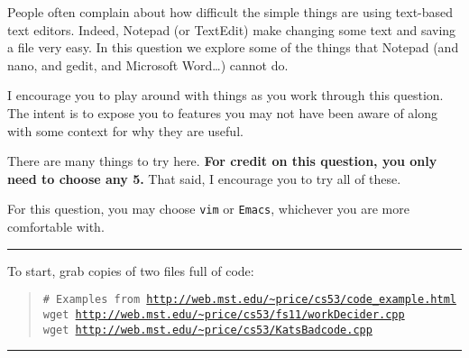 \documentclass{article}
\begin{document}
People often complain about how difficult the simple things are using
text-based text editors. Indeed, Notepad (or TextEdit) make changing some
text and saving a file very easy.
In this question we explore some of the things that Notepad (and nano, and
gedit, and Microsoft Word\dots) cannot do.

I encourage you to play around with things as you work through this question.
The intent is to expose you to features you may not have been aware of along
with some context for why they are useful.

There are many things to try here.
\textbf{For credit on this question, you only need to choose any 5.}
That said, I encourage you to try all of these.

For this question, you may choose \texttt{vim} or \texttt{Emacs}, whichever
you are more comfortable with.

\bigskip
\hrule
To start, grab copies of two files full of code:
\begin{quote}
  \texttt{\# Examples from \url{http://web.mst.edu/~price/cs53/code_example.html}}\\
  \texttt{wget \url{http://web.mst.edu/~price/cs53/fs11/workDecider.cpp}}\\
  \texttt{wget \url{http://web.mst.edu/~price/cs53/KatsBadcode.cpp}}
\end{quote}
\smallskip
\hrule
\bigskip
\end{document}
